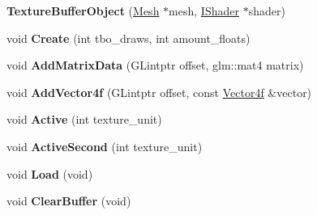 \begin{DoxyCompactItemize}
\item 
\hypertarget{classEngine_1_1TextureBufferObject_a8742339af965a5822dff5593406fdde0}{}{\bfseries Texture\+Buffer\+Object} (\hyperlink{classEngine_1_1Mesh}{Mesh} $\ast$mesh, \hyperlink{classEngine_1_1IShader}{I\+Shader} $\ast$shader)\label{classEngine_1_1TextureBufferObject_a8742339af965a5822dff5593406fdde0}

\item 
\hypertarget{classEngine_1_1TextureBufferObject_ab4c8ce23aab962d20ad70ceafd232480}{}void {\bfseries Create} (int tbo\+\_\+draws, int amount\+\_\+floats)\label{classEngine_1_1TextureBufferObject_ab4c8ce23aab962d20ad70ceafd232480}

\item 
\hypertarget{classEngine_1_1TextureBufferObject_a94dd6f3929a30f8e057bcba1eb0a5384}{}void {\bfseries Add\+Matrix\+Data} (G\+Lintptr offset, glm\+::mat4 matrix)\label{classEngine_1_1TextureBufferObject_a94dd6f3929a30f8e057bcba1eb0a5384}

\item 
\hypertarget{classEngine_1_1TextureBufferObject_a418031ad0469d070b98e0578a751e991}{}void {\bfseries Add\+Vector4f} (G\+Lintptr offset, const \hyperlink{classVector4}{Vector4f} \&vector)\label{classEngine_1_1TextureBufferObject_a418031ad0469d070b98e0578a751e991}

\item 
\hypertarget{classEngine_1_1TextureBufferObject_afb79f761150de0338413acd4a90f89b5}{}void {\bfseries Active} (int texture\+\_\+unit)\label{classEngine_1_1TextureBufferObject_afb79f761150de0338413acd4a90f89b5}

\item 
\hypertarget{classEngine_1_1TextureBufferObject_a8b0d42e3e601b3f641494879d61a8204}{}void {\bfseries Active\+Second} (int texture\+\_\+unit)\label{classEngine_1_1TextureBufferObject_a8b0d42e3e601b3f641494879d61a8204}

\item 
\hypertarget{classEngine_1_1TextureBufferObject_a25e1da5fcb6f30d2a03d42de09d02bf9}{}void {\bfseries Load} (void)\label{classEngine_1_1TextureBufferObject_a25e1da5fcb6f30d2a03d42de09d02bf9}

\item 
\hypertarget{classEngine_1_1TextureBufferObject_ad09326a432fe56f53b94bb49e69c0bbd}{}void {\bfseries Clear\+Buffer} (void)\label{classEngine_1_1TextureBufferObject_ad09326a432fe56f53b94bb49e69c0bbd}

\end{DoxyCompactItemize}


